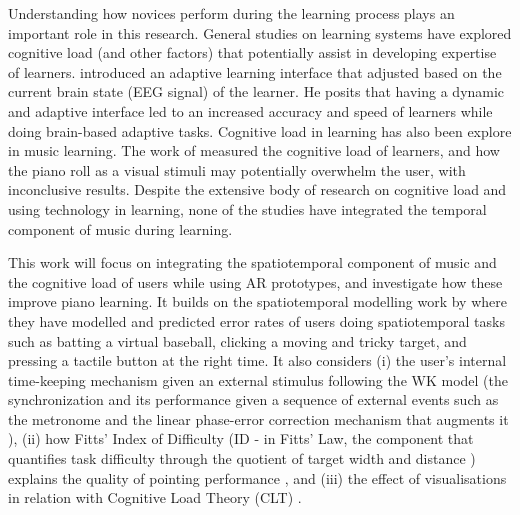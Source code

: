 \documentclass[manuscript,screen]{acmart}
\begin{document}
Understanding how novices perform during the learning process plays an important role in this research. General studies on learning systems have explored cognitive load (and other factors) that potentially assist in developing expertise of learners. \citet{yuksel2016learn} introduced an adaptive learning interface that adjusted based on the current brain state (EEG signal) of the learner. He posits that having a dynamic and adaptive interface led to an increased accuracy and speed of learners while doing brain-based adaptive tasks.   
Cognitive load in learning has also  been explore in music learning. 
The work of \citet{klepsch2017development} measured the cognitive load of learners, and how the piano roll as a visual stimuli may potentially overwhelm the user, with inconclusive results.
Despite the extensive body of research on cognitive load and using technology in learning, none of the studies have integrated the temporal component of music during learning.  

This work will focus on integrating the spatiotemporal component of music and the cognitive load of users while using AR prototypes, and investigate how these improve piano learning. It builds on the spatiotemporal modelling work by \citet{lee2016modelling, lee2017boxer, kim2018impact, liao2020button} where they have modelled and predicted error rates of users doing spatiotemporal tasks such as batting a virtual baseball, clicking a moving and tricky target, and pressing a tactile button at the right time. It also considers (i) the user's internal time-keeping mechanism given an external stimulus following the WK model (the synchronization and its performance given a sequence of external events such as the metronome \cite{wing1973response, wing1973timing} and the linear phase-error correction mechanism that augments it \cite{pressing1998error, vorberg2002linear}), (ii) how Fitts' Index of Difficulty (ID - in Fitts' Law, the component that quantifies task difficulty through the quotient of target width and distance \cite{fitts1954information, huys2015does})  explains the quality of pointing performance \cite{mackenzie1992extending, park2020intermittent}, and (iii) the effect of visualisations in relation with Cognitive Load Theory (CLT) \cite{khalil2005design, klepsch2017development}.
\end{document}
